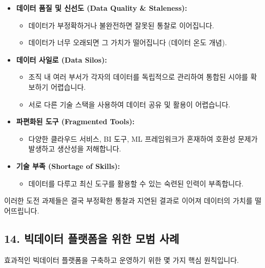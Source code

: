 \documentclass[11pt,a4paper]{article}
\begin{document}
\begin{itemize}
    \item \textbf{데이터 품질 및 신선도 (Data Quality & Staleness):}
    \begin{itemize}
        \item 데이터가 부정확하거나 불완전하면 잘못된 통찰로 이어집니다.
        \item 데이터가 너무 오래되면 그 가치가 떨어집니다 (데이터 온도 개념).
    \end{itemize}
    \item \textbf{데이터 사일로 (Data Silos):}
    \begin{itemize}
        \item 조직 내 여러 부서가 각자의 데이터를 독립적으로 관리하여 통합된 시야를 확보하기 어렵습니다.
        \item 서로 다른 기술 스택을 사용하여 데이터 공유 및 활용이 어렵습니다.
    \end{itemize}
    \item \textbf{파편화된 도구 (Fragmented Tools):}
    \begin{itemize}
        \item 다양한 클라우드 서비스, BI 도구, ML 프레임워크가 혼재하여 호환성 문제가 발생하고 생산성을 저해합니다.
    \end{itemize}
    \item \textbf{기술 부족 (Shortage of Skills):}
    \begin{itemize}
        \item 데이터를 다루고 최신 도구를 활용할 수 있는 숙련된 인력이 부족합니다.
    \end{itemize}
\end{itemize}
이러한 도전 과제들은 결국 부정확한 통찰과 지연된 결과로 이어져 데이터의 가치를 떨어뜨립니다.

\subsection*{14. 빅데이터 플랫폼을 위한 모범 사례}

효과적인 빅데이터 플랫폼을 구축하고 운영하기 위한 몇 가지 핵심 원칙입니다.
\end{document}

